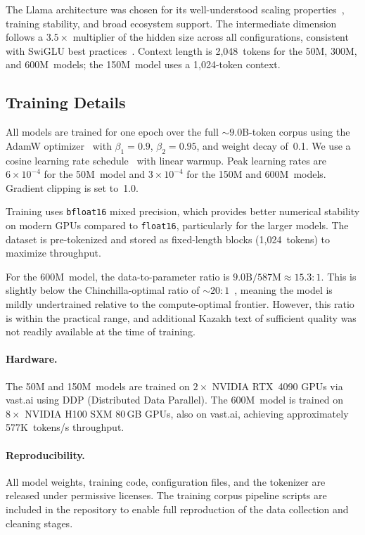 The Llama architecture was chosen for its well-understood scaling
properties~\citep{kaplan2020scaling}, training stability, and broad ecosystem
support. The intermediate dimension follows a $3.5\times$ multiplier of the
hidden size across all configurations, consistent with SwiGLU best
practices~\citep{shazeer2020glu}. Context length is 2{,}048~tokens for the
50M, 300M, and 600M~models; the 150M~model uses a 1{,}024-token context.

\subsection{Training Details}
\label{sec:training}

All models are trained for one epoch over the full ${\sim}9.0$B-token corpus
using the AdamW optimizer~\citep{loshchilov2017adamw} with $\beta_1 = 0.9$,
$\beta_2 = 0.95$, and weight decay of~0.1. We use a cosine learning rate
schedule~\citep{loshchilov2016cosine} with linear warmup. Peak learning rates
are $6 \times 10^{-4}$ for the 50M~model and $3 \times 10^{-4}$ for the 150M
and 600M~models. Gradient clipping is set to~1.0.

Training uses \texttt{bfloat16} mixed precision, which provides better numerical
stability on modern GPUs compared to \texttt{float16}, particularly for the
larger models. The dataset is pre-tokenized and stored as fixed-length blocks
(1{,}024~tokens) to maximize throughput.

For the 600M~model, the data-to-parameter ratio is $9.0\text{B} / 587\text{M}
\approx 15.3{:}1$. This is slightly below the Chinchilla-optimal ratio of
${\sim}20{:}1$~\citep{hoffmann2022chinchilla}, meaning the model is mildly
undertrained relative to the compute-optimal frontier. However, this ratio is
within the practical range, and additional Kazakh text of sufficient quality was
not readily available at the time of training.

\paragraph{Hardware.}
The 50M and 150M~models are trained on $2\times$ NVIDIA RTX~4090 GPUs via
vast.ai using DDP (Distributed Data Parallel). The 600M~model is trained on
$8\times$ NVIDIA H100 SXM 80\,GB GPUs, also on vast.ai, achieving
approximately 577K~tokens/s throughput.

\paragraph{Reproducibility.}
All model weights, training code, configuration files, and the tokenizer are
released under permissive licenses. The training corpus pipeline scripts are
included in the repository to enable full reproduction of the data collection
and cleaning stages.
